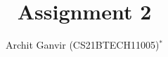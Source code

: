 \documentclass[journal,12pt,twocolumn]{IEEEtran}
\begin{document}
\let\StandardTheFigure\thefigure
\let\vec\mathbf
\renewcommand{\thefigure}{\theproblem}



\def\putbox#1#2#3{\makebox[0in][l]{\makebox[#1][l]{}\raisebox{\baselineskip}[0in][0in]{\raisebox{#2}[0in][0in]{#3}}}}
     \def\rightbox#1{\makebox[0in][r]{#1}}
     \def\centbox#1{\makebox[0in]{#1}}
     \def\topbox#1{\raisebox{-\baselineskip}[0in][0in]{#1}}
     \def\midbox#1{\raisebox{-0.5\baselineskip}[0in][0in]{#1}}

\vspace{3cm}

\title{
	Assignment 2
}
\author{ Archit Ganvir (CS21BTECH11005)$^{*}$%
}	


%
%
%

% 
%
\end{document}
